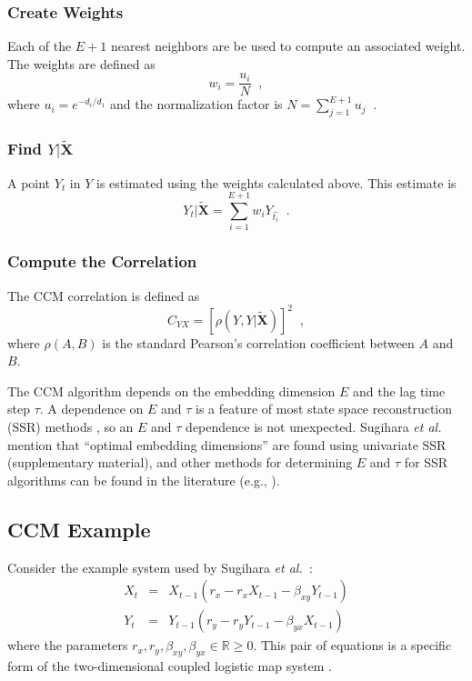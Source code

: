 \documentclass[twocolumn,aps,pre,groupedaddress]{revtex4-1}
\begin{document}
\subsubsection{Create Weights}
Each of the $E+1$ nearest neighbors are be used to compute an associated weight.  The weights are defined as
$$
w_i = \frac{u_i}{N}\;\;,
$$
where
$u_i = e^{-d_i/d_1}$ and the normalization factor is $N = \sum_{j=1}^{E+1} u_j\;\;.$

\subsubsection{Find $Y|\tilde{\mathbf{X}}$}
A point $Y_t$ in $Y$ is estimated using the weights calculated above.  This estimate is
$$
Y_t|\tilde{\mathbf{X}} = \sum_{i=1}^{E+1} w_i Y_{\hat{t_i}}\;\;.
$$

\subsubsection{Compute the Correlation}
The CCM correlation is defined as 
$$
C_{YX} = \left[\rho\left(Y,Y|\tilde{\mathbf{X}}\right)\right]^2\;\;,
$$
where $\rho\left(A,B\right)$ is the standard Pearson's correlation coefficient between $A$ and $B$.  

The CCM algorithm depends on the embedding dimension $E$ and the lag time step $\tau$.  A dependence on $E$ and $\tau$ is a feature of most state space reconstruction (SSR) methods \cite{Hong2006,vlachos2009,Small2004}, so an $E$ and $\tau$ dependence is not unexpected.  Sugihara {\em et al.} mention that ``optimal embedding dimensions'' are found using univariate SSR \cite{Sugihara2012} (supplementary material), and other methods for determining $E$ and $\tau$ for SSR algorithms can be found in the literature (e.g., \cite{Hong2006,Small2004,Kennel1992}).

\subsection{CCM Example}
\label{sec:2Pop}
Consider the example system used by Sugihara {\em et al.\ }\cite{Sugihara2012}:
\begin{eqnarray}
\label{eqn:2pop}
X_t &=& X_{t-1}\left(r_x-r_x X_{t-1}-\beta_{xy} Y_{t-1}\right)\\
Y_t &=& Y_{t-1}\left(r_y-r_y Y_{t-1}-\beta_{yx} X_{t-1}\right)
\end{eqnarray}
where the parameters $r_x,r_y,\beta_{xy},\beta_{yx}\in\mathbb{R}\ge 0$.  This pair of equations is a specific form of the two-dimensional coupled logistic map system \cite{Lloyd1995}.
\end{document}
